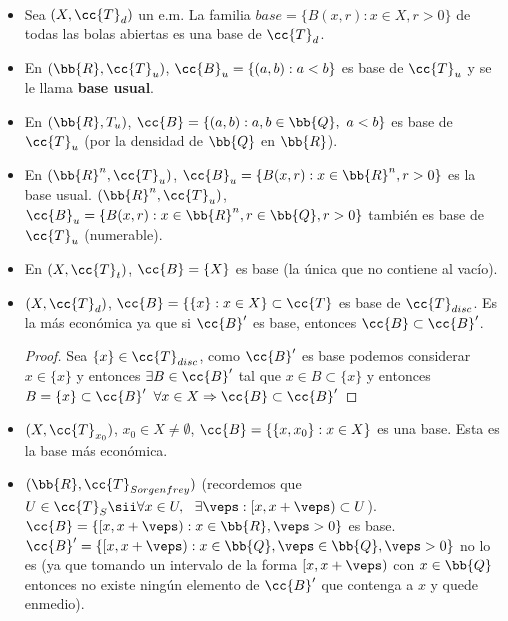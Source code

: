 \begin{ejemplo}\
    \begin{itemize}
        \item Sea $(X,\cc{T}_d)$ un e.m. La familia $base=\{B(x,r):x\in X, r>0\}$ de todas las bolas abiertas es una base de $\cc{T}_d$.
        \item En $(\bb{R},\cc{T}_u)$, $\cc{B}_u=\{(a,b):a<b\}$ es base de $\cc{T}_u$ y se le llama \textbf{base usual}.
        \item En $(\bb{R},T_u)$, $\cc{B}=\{(a,b): a,b\in \bb{Q},\ a<b\}$ es base de $\cc{T}_u$ (por la densidad de $\bb{Q}$ en $\bb{R}$).
        \item En $(\bb{R}^n, \cc{T}_u)$, $\cc{B}_u=\{B(x,r): x\in \bb{R}^n, r>0\}$ es la base usual. $(\bb{R}^n, \cc{T}_u)$, $\cc{B}_u=\{B(x,r): x\in \bb{R}^n, r\in \bb{Q}, r>0\}$ también es base de $\cc{T}_u$ (numerable).
        \item En $(X,\cc{T}_t)$, $\cc{B}=\{X\}$ es base (la única que no contiene al vacío).
        \item $(X,\cc{T}_d)$, $\cc{B}=\{\{x\}: x\in X\}\subset \cc{T}$ es base de $\cc{T}_{disc}$. Es la más económica ya que si $\cc{B}'$ es base, entonces $\cc{B}\subset \cc{B}'$.
        \begin{proof}
            Sea $\{x\}\in \cc{T}_{disc}$, como $\cc{B}'$ es base podemos considerar $x\in \{x\}$ y entonces $\exists B \in \cc{B}'$ tal que $x\in B \subset \{x\}$ y entonces $B=\{x\}\subset \cc{B}'$ $\forall x \in X\Rightarrow \cc{B}\subset \cc{B}'$
        \end{proof}
        \item $(X, \cc{T}_{x_0})$, $x_0 \in X \neq \emptyset$, $\cc{B}=\{\{x,x_0\}: x\in X\}$ es una base. Esta es la base más económica.
        \item $(\bb{R}, \cc{T}_{Sorgenfrey})$ (recordemos que $U \in \cc{T}_S \sii \forall x \in U,\ \ \exists \veps : [x, x+\veps)\subset U$). $\cc{B}=\{[x,x+\veps): x\in \bb{R}, \veps>0\}$ es base. $\cc{B}'=\{[x,x+\veps): x\in \bb{Q}, \veps\in \bb{Q}, \veps>0\}$ no lo es (ya que tomando un intervalo de la forma $[x,x+\veps)$ con $x\in \bb{Q}$ entonces no existe ningún elemento de $\cc{B}'$ que contenga a $x$ y quede enmedio).
    \end{itemize}
    \endsquare
\end{ejemplo}

